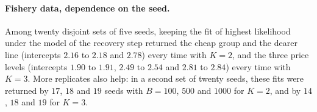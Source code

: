 \paragraph{Fishery data, dependence on the seed.} Among twenty disjoint sets of five seeds,
keeping the fit of highest likelihood under the model of the recovery step returned the cheap group
and the dearer line (intercepts $2.16$ to $2.18$ and $2.78$) every time with $K=2$, and the
three price levels (intercepts $1.90$ to $1.91$, $2.49$ to $2.54$ and $2.81$ to $2.84$) every
time with $K=3$. More replicates also help: in a second set of twenty seeds, these fits were
returned by $17$, $18$ and $19$ seeds with $B=100$, $500$ and $1000$ for $K=2$, and by $14$, $18$
and $19$ for $K=3$.
